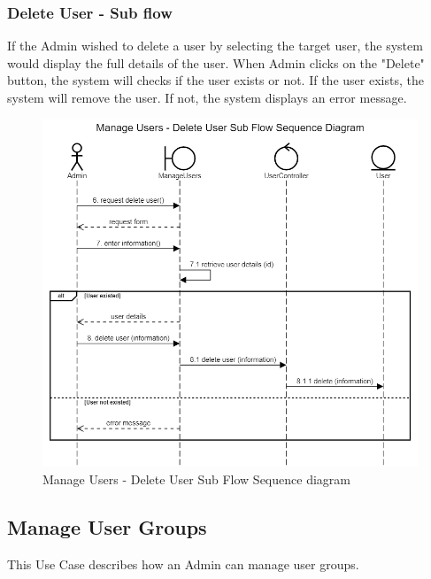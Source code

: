\subsubsection{Delete User - Sub flow}
If the Admin wished to delete a user by selecting the target user, the system would display the full details of the user. When Admin clicks on the "Delete" button, the system will checks if the user exists or not. If the user exists, the system will remove the user. If not, the system displays an error message.
\begin{figure}[H]
    \centering
    \includegraphics[width=1.0\textwidth]{images/Manage Users - Delete User Sub Flow Sequence Diagram.png}
    \caption{Manage Users - Delete User Sub Flow Sequence diagram}
    \label{fig:SeqUsersDelete}
\end{figure}

\subsection{Manage User Groups}
This Use Case describes how an Admin can manage user groups.
